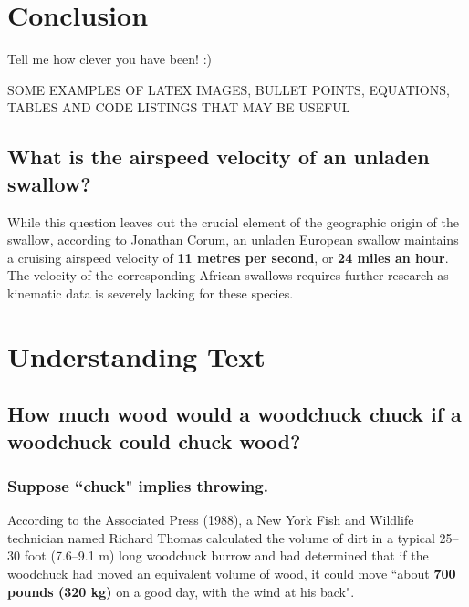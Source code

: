\documentclass[11pt]{scrartcl} %
\begin{document}
\section{Conclusion}

Tell me how clever you have been! :)


\iffalse
\newpage
SOME EXAMPLES OF LATEX IMAGES, BULLET POINTS, EQUATIONS, TABLES AND CODE LISTINGS THAT MAY BE USEFUL


\subsection{What is the airspeed velocity of an unladen swallow?}

While this question leaves out the crucial element of the geographic origin of the swallow, according to Jonathan Corum, an unladen European swallow maintains a cruising airspeed velocity of \textbf{11 metres per second}, or \textbf{24 miles an hour}. The velocity of the corresponding African swallows requires further research as kinematic data is severely lacking for these species.


\section{Understanding Text}

\subsection{How much wood would a woodchuck chuck if a woodchuck could chuck wood?}


\subsubsection{Suppose ``chuck" implies throwing.}

According to the Associated Press (1988), a New York Fish and Wildlife technician named Richard Thomas calculated the volume of dirt in a typical 25--30 foot (7.6--9.1 m) long woodchuck burrow and had determined that if the woodchuck had moved an equivalent volume of wood, it could move ``about \textbf{700 pounds (320 kg)} on a good day, with the wind at his back".
\end{document}
